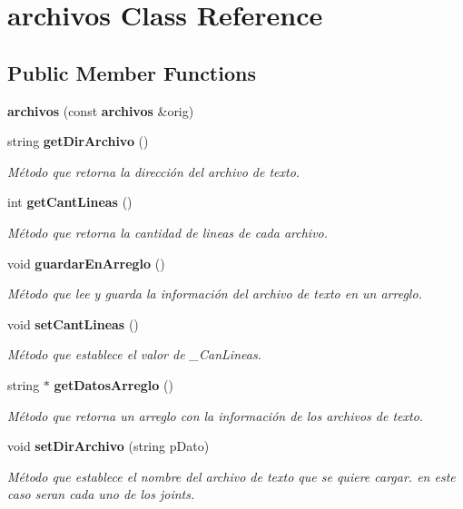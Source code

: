 \section{archivos Class Reference}
\label{classarchivos}
\subsection*{Public Member Functions}
\begin{DoxyCompactItemize}
\item 
{\bfseries archivos} (const {\bf archivos} \&orig)\label{classarchivos_af205eb015b2183250068059ca187fb8f}

\item 
string {\bf get\-Dir\-Archivo} ()
\begin{DoxyCompactList}\small\item\em Método que retorna la dirección del archivo de texto. \end{DoxyCompactList}\item 
int {\bf get\-Cant\-Lineas} ()
\begin{DoxyCompactList}\small\item\em Método que retorna la cantidad de lineas de cada archivo. \end{DoxyCompactList}\item 
void {\bf guardar\-En\-Arreglo} ()
\begin{DoxyCompactList}\small\item\em Método que lee y guarda la información del archivo de texto en un arreglo. \end{DoxyCompactList}\item 
void {\bf set\-Cant\-Lineas} ()
\begin{DoxyCompactList}\small\item\em Método que establece el valor de \-\_\-\-Can\-Lineas. \end{DoxyCompactList}\item 
string $\ast$ {\bf get\-Datos\-Arreglo} ()
\begin{DoxyCompactList}\small\item\em Método que retorna un arreglo con la información de los archivos de texto. \end{DoxyCompactList}\item 
void {\bf set\-Dir\-Archivo} (string p\-Dato)
\begin{DoxyCompactList}\small\item\em Método que establece el nombre del archivo de texto que se quiere cargar. en este caso seran cada uno de los joints. \end{DoxyCompactList}\end{DoxyCompactItemize}


